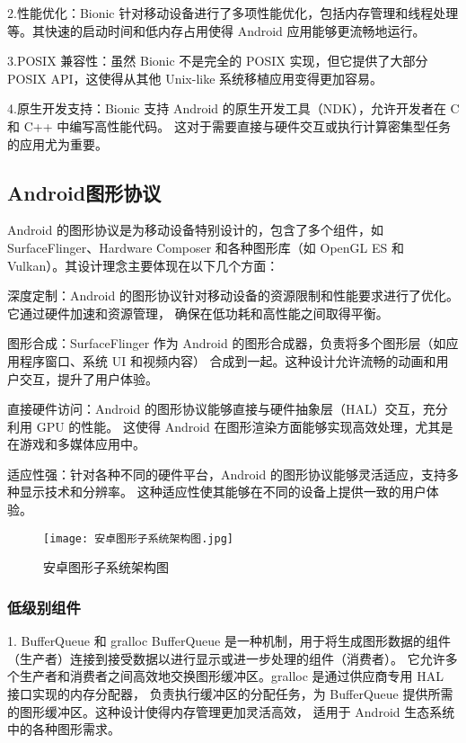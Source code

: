 2.性能优化：Bionic 针对移动设备进行了多项性能优化，包括内存管理和线程处理等。其快速的启动时间和低内存占用使得 
Android 应用能够更流畅地运行。

3.POSIX 兼容性：虽然 Bionic 不是完全的 POSIX 实现，但它提供了大部分 POSIX API，这使得从其他 Unix-like 
系统移植应用变得更加容易。

4.原生开发支持：Bionic 支持 Android 的原生开发工具（NDK），允许开发者在 C 和 C++ 中编写高性能代码。
这对于需要直接与硬件交互或执行计算密集型任务的应用尤为重要。

\subsection{Android图形协议}
Android 的图形协议是为移动设备特别设计的，包含了多个组件，如 SurfaceFlinger、Hardware Composer 
和各种图形库（如 OpenGL ES 和 Vulkan）。其设计理念主要体现在以下几个方面：

深度定制：Android 的图形协议针对移动设备的资源限制和性能要求进行了优化。它通过硬件加速和资源管理，
确保在低功耗和高性能之间取得平衡。

图形合成：SurfaceFlinger 作为 Android 的图形合成器，负责将多个图形层（如应用程序窗口、系统 UI 和视频内容）
合成到一起。这种设计允许流畅的动画和用户交互，提升了用户体验。

直接硬件访问：Android 的图形协议能够直接与硬件抽象层（HAL）交互，充分利用 GPU 的性能。
这使得 Android 在图形渲染方面能够实现高效处理，尤其是在游戏和多媒体应用中。

适应性强：针对各种不同的硬件平台，Android 的图形协议能够灵活适应，支持多种显示技术和分辨率。
这种适应性使其能够在不同的设备上提供一致的用户体验。

\begin{figure}[h]
  \centering
  \texttt{[image: 安卓图形子系统架构图.jpg]}
  \caption{安卓图形子系统架构图}
\end{figure}

\subsubsection{低级别组件}

1. BufferQueue 和 gralloc
BufferQueue 是一种机制，用于将生成图形数据的组件（生产者）连接到接受数据以进行显示或进一步处理的组件（消费者）。
它允许多个生产者和消费者之间高效地交换图形缓冲区。gralloc 是通过供应商专用 HAL 接口实现的内存分配器，
负责执行缓冲区的分配任务，为 BufferQueue 提供所需的图形缓冲区。这种设计使得内存管理更加灵活高效，
适用于 Android 生态系统中的各种图形需求。

